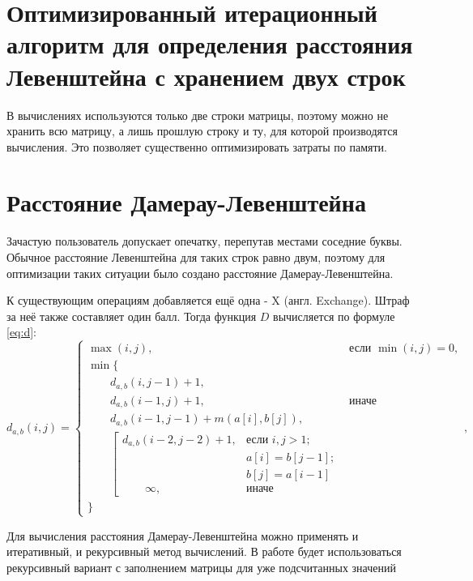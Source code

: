 \section{Оптимизированный итерационный алгоритм для определения расстояния Левенштейна с хранением двух строк}
В вычислениях используются только две строки матрицы, поэтому можно не хранить всю матрицу, а лишь прошлую строку и ту, для которой производятся вычисления. Это позволяет существенно оптимизировать затраты по памяти.

\section{Расстояние Дамерау-Левенштейна}
Зачастую пользователь допускает опечатку, перепутав местами соседние буквы. Обычное расстояние Левенштейна для таких строк равно двум, поэтому для оптимизации таких ситуации было создано расстояние Дамерау-Левенштейна.

К существующим операциям добавляется ещё одна - X (англ. Exchange). Штраф за неё также составляет один балл. Тогда функция $D$ вычисляется по формуле \ref{eq:d}:
\begin{equation}
	\label{eq:d}
	d_{a,b}(i, j) = \begin{cases}
		\max(i, j), &\text{если }\min(i, j) = 0,\\
		\min \lbrace \\
			\qquad d_{a,b}(i, j-1) + 1,\\
			\qquad d_{a,b}(i-1, j) + 1, &\text{иначе}\\
			\qquad d_{a,b}(i-1, j-1) + m(a[i], b[j]),\\
			\qquad \left[ \begin{array}{cc}d_{a,b}(i-2, j-2) + 1, &\text{если }i,j > 1;\\
			\qquad &\text{}a[i] = b[j-1]; \\
			\qquad &\text{}b[j] = a[i-1]\\
			\qquad \infty, & \text{иначе}\end{array}\right.\\
		\rbrace
		\end{cases},
\end{equation}

Для вычисления расстояния Дамерау-Левенштейна можно применять и итеративный, и рекурсивный метод вычислений. В работе будет использоваться рекурсивный вариант с заполнением матрицы для уже подсчитанных значений